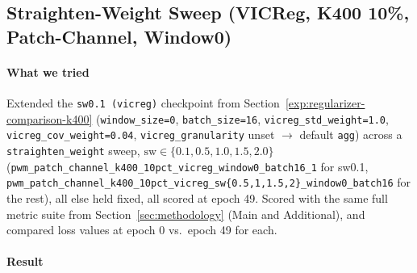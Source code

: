 \subsection{Straighten-Weight Sweep (VICReg, K400 10\%, Patch-Channel, Window0)}
\label{exp:sw-sweep-vicreg}

\paragraph{What we tried} Extended the \texttt{sw0.1 (vicreg)} checkpoint from
Section~\ref{exp:regularizer-comparison-k400} (\texttt{window\_size=0},
\texttt{batch\_size=16}, \texttt{vicreg\_std\_weight=1.0}, \texttt{vicreg\_cov\_weight=0.04},
\texttt{vicreg\_granularity} unset $\to$ default \texttt{agg}) across a
\texttt{straighten\_weight} sweep, $\mathrm{sw} \in \{0.1, 0.5, 1.0, 1.5, 2.0\}$
(\texttt{pwm\_patch\_channel\_k400\_10pct\_vicreg\_window0\_batch16\_1} for sw0.1,
\texttt{pwm\_patch\_channel\_k400\_10pct\_vicreg\_sw\{0.5,1,1.5,2\}\_window0\_batch16}
for the rest), all else held fixed, all scored at epoch 49. Scored with the same full
metric suite from Section~\ref{sec:methodology} (Main and Additional), and compared loss
values at epoch 0 vs.\ epoch 49 for each.

\paragraph{Result}

